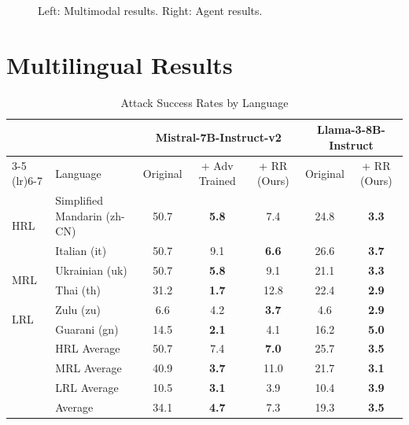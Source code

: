 \begin{figure}[t]
    \centering
    \begin{minipage}[lr]{0.49\textwidth} %
        \centering
    \end{minipage}
    \begin{minipage}[lr]{0.49\textwidth} %
        \centering
    \end{minipage}
    \caption{Left: Multimodal results. Right: Agent results.}
    \label{table:mm-results-expanded}
\end{figure}


\section{Multilingual Results}
\begin{table}[ht]
\small
\centering
\caption{Attack Success Rates by Language}
\label{table:multilingual_asr}
\begin{tabular}{llccccc}
\toprule
& & \multicolumn{3}{c}{Mistral-7B-Instruct-v2} & \multicolumn{2}{c}{Llama-3-8B-Instruct} \\
\cmidrule(lr){3-5} \cmidrule(lr){6-7}
& Language & Original & + Adv Trained & + RR (Ours) & Original & + RR (Ours) \\
\midrule
\multirow{2}{*}{HRL} & Simplified Mandarin (zh-CN) & 50.7 & \textbf{5.8} & 7.4 & 24.8 & \textbf{3.3} \\
& Italian (it) & 50.7 & 9.1 & \textbf{6.6} & 26.6 & \textbf{3.7} \\
\midrule
\multirow{2}{*}{MRL} & Ukrainian (uk) & 50.7 & \textbf{5.8} & 9.1 & 21.1 & \textbf{3.3} \\
& Thai (th) & 31.2 & \textbf{1.7} & 12.8 & 22.4 & \textbf{2.9} \\
\midrule
\multirow{2}{*}{LRL} & Zulu (zu) & 6.6 & 4.2 & \textbf{3.7} & 4.6 & \textbf{2.9} \\
& Guarani (gn) & 14.5 & \textbf{2.1} & 4.1 & 16.2 & \textbf{5.0} \\
\midrule
& HRL Average & 50.7 & 7.4 & \textbf{7.0} & 25.7 & \textbf{3.5} \\
& MRL Average & 40.9 & \textbf{3.7} & 11.0 & 21.7 & \textbf{3.1} \\
& LRL Average & 10.5 & \textbf{3.1} & 3.9 & 10.4 & \textbf{3.9} \\
& Average & 34.1 & \textbf{4.7} & 7.3 & 19.3 & \textbf{3.5} \\
\bottomrule
\end{tabular}
\end{table}


